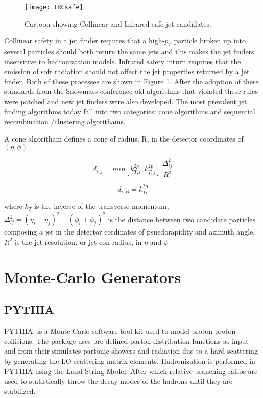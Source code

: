 \begin{figure}[h]
\texttt{[image: IRCsafe]}
\centering
\caption{Cartoon showing Collinear and Infrared safe jet candidates\cite{Blazey:2000qt}.}
\label{fig:IRCsafe}
\end{figure}


Collinear safety in a jet finder requires that a high-$p_{T}$ particle broken up into several particles should both return the same jets and this makes the jet finders insensitive to hadronization models.  Infrared safety inturn requires that the emission of soft radiation should not affect the jet properties returned by a jet finder.  Both of these processes are shown in Figure \ref{fig:IRCsafe}.  After the adoption of these standards from the Snowmass conference old algorithms that violated these rules were patched and new jet finders were also developed.  The most prevalent jet finding algorithms today fall into two categories: cone algorithms and sequential recombination /clustering algorithams.

A cone algoritham defines a cone of radius, R, in the detector coordinates of $(\eta,\phi)$

\begin{equation}
d_{i,j} = min[k^{2p}_{T,i},k^{2p}_{T,j}] \, \frac{\Delta^{2}_{ij}}{R^{2}}
\label{eq:JetAlgo}
\end{equation}

\begin{equation}
d_{i,B} = k^{2p}_{Ti}
\label{eq:MinJet}
\end{equation}

\noindent
where $k_{T}$ is the inverse of the transverse momentum, $\Delta^{2}_{ij} = (\eta_{i} - \eta_{j})^{2} + (\phi_{i} + \phi_{j})^{2}$ is the distance between two candidate particles composing a jet in the detector cordinates of psuedorapidity and azimuth angle, $R^{2}$ is the jet resolution, or jet con radius, in $\eta$ and $\phi$

\section{Monte-Carlo Generators}
\subsection{PYTHIA}

PYTHIA\cite{Sjostrand:2007gs}, is a Monte Carlo software tool-kit used to model proton-proton collisions.  The package uses pre-defined parton distribution functions as input and from their simulates partonic showers and radiation due to a hard scattering by generating the LO scattering matrix elements.  Hadronization is performed in PYTHIA using the Lund String Model.  After which relative branching ratios are used to statistically throw the decay modes of the hadrons until they are stabilized.  



